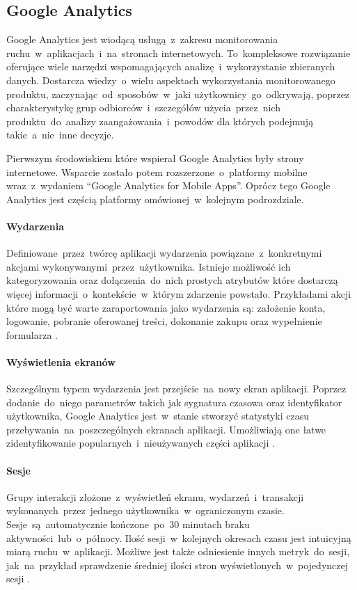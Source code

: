 \subsection{Google Analytics}
\label{sec:ga}
Google Analytics jest wiodącą usługą~z~zakresu monitorowania ruchu~w~aplikacjach~i~na~stronach internetowych. To~kompleksowe rozwiązanie oferujące wiele narzędzi wspomagających analizę~i~wykorzystanie zbieranych danych. Dostarcza wiedzy~o~wielu aspektach wykorzystania monitorowanego produktu, zaczynając~od~sposobów~w~jaki użytkownicy~go~odkrywają, poprzez charakterystykę grup odbiorców~i~szczegółów użycia~przez~nich produktu~do~analizy zaangażowania~i~powodów dla których podejmują takie~a~nie~inne decyzje.

Pierwszym środowiskiem które wspierał Google Analytics były strony internetowe. Wsparcie zostało potem rozszerzone~o~platformy mobilne wraz~z~wydaniem ``Google Analytics for Mobile Apps''. Oprócz tego Google Analytics jest częścią platformy  omówionej~w~kolejnym podrozdziale.


\paragraph{Wydarzenia}
\label{par:ga-events}
Definiowane~przez~twórcę aplikacji wydarzenia powiązane~z~konkretnymi akcjami wykonywanymi~przez~użytkownika. Istnieje możliwość ich kategoryzowania oraz dołączenia~do~nich prostych atrybutów które dostarczą więcej informacji~o~kontekście~w~którym zdarzenie powstało. Przykładami akcji które mogą być warte zaraportowania jako wydarzenia są: założenie konta, logowanie, pobranie oferowanej treści, dokonanie zakupu oraz wypełnienie formularza \cite{GA_Events}.

\paragraph{Wyświetlenia ekranów}
Szczególnym typem wydarzenia jest przejście~na~nowy ekran aplikacji. Poprzez dodanie~do~niego parametrów takich jak sygnatura czasowa oraz identyfikator użytkownika, Google Analytics jest~w~stanie stworzyć statystyki czasu przebywania~na~poszczególnych ekranach aplikacji. Umożliwiają one łatwe zidentyfikowanie popularnych~i~nieużywanych części aplikacji \cite{GA_Pages}.

\paragraph{Sesje}
Grupy interakcji złożone~z~wyświetleń ekranu, wydarzeń~i~transakcji wykonanych~przez~jednego użytkownika~w~ograniczonym czasie. Sesje~są~automatycznie kończone~po~30 minutach braku aktywności~lub~o~północy. Ilość sesji~w~kolejnych okresach czasu jest intuicyjną miarą ruchu~w~aplikacji. Możliwe jest także odniesienie innych metryk~do~sesji, jak~na~przykład sprawdzenie średniej ilości stron wyświetlonych~w~pojedynczej sesji \cite{GA_Sessions}.

